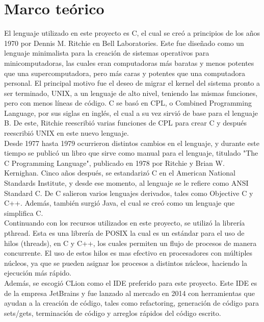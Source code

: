 \documentclass[10pt, article, natbib]{IEEEtran}
\begin{document}
\section{Marco teórico}
El lenguaje utilizado en este proyecto es C, el cual se creó a principios de los años 1970 por Dennis M. Ritchie en Bell Laboratories. Este fue diseñado como un lenguaje minimalista para la creación de sistemas operativos para minicomputadoras, las cuales eran computadoras más baratas y menos potentes que una supercomputadora, pero más caras y potentes que una computadora personal. El principal motivo fue el deseo de migrar el kernel del sistema pronto a ser terminado, UNIX, a un lenguaje de alto nivel, teniendo las mismas funciones, pero con menos líneas de código. C se basó en CPL, o Combined Programming Language, por sus siglas en inglés, el cual a su vez sirvió de base para el lenguaje B. De este, Ritchie reescribió varias funciones de CPL para crear C y después reescribió UNIX en este nuevo lenguaje.\cite{encyclopdiabritannica_2022_c} \cite{munoz_after}\\

Desde 1977 hasta 1979 ocurrieron distintos cambios en el lenguaje, y durante este tiempo se publicó un libro que sirve como manual para el lenguaje, titulado "The C Programming Language", publicado en 1978 por Ritchie y Brian W. Kernighan. Cinco años después, se estandarizó C en el American National Standards Institute, y desde ese momento, al lenguaje se le refiere como ANSI Standard C. De C salieron varios lenguajes derivados, tales como Objective C y C++. Además, también surgió Java, el cual se creó como un lenguaje que simplifica C.\cite{mritchie_1993_the}\\

Continuando con los recursos utilizados en este proyecto, se utilizó la librería pthread. Esta es una librería de POSIX la cual es un estándar para el uso de hilos (threads), en C y C++, los cuales permiten un flujo de procesos de manera concurrente. El uso de estos hilos es mas efectivo en procesadores con múltiples núcleos, ya que se pueden asignar los procesos a distintos núcleos, haciendo la ejecución más rápido.\cite{ippolito_2020_linux}\\

Además, se escogió CLion como el IDE preferido para este proyecto. Este IDE es de la empresa JetBrains y fue lanzado al mercado en 2014\cite{avram_2014_jetbrains} con herramientas que ayudan a la creación de código, tales como refactoring, generación de código para sets/gets, terminación de código y arreglos rápidos del código escrito.\cite{jetbrains_intelligent}\\
\end{document}
